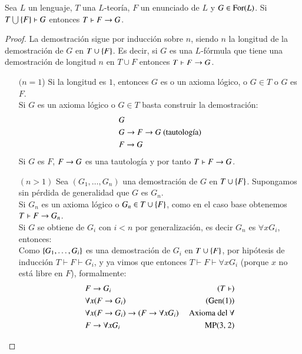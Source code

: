 \begin{thm}\label{thm:td}
    Sea $L$ un lenguaje, $T$ una $L$-teoría, $F$ un enunciado de $L$ y $G \in \mathrm{For}(L)$. Si $T \bigcup \left\{F\right\} \vdash G$ entonces $T \vdash F \rightarrow G$.
\end{thm}
\begin{proof}
    La demostración sigue por inducción sobre $n$, siendo $n$ la longitud de la demostración de $G$ en $T \cup \left\{F\right\}$. Es decir, si $G$ es una $L$-fórmula que tiene una demostración de longitud $n$ en $T \cup {F}$ entonces $T \vdash F \rightarrow G$.
    \begin{itemize}
        \item[$(n=1$)] Si la longitud es $1$, entonces $G$ es o un axioma lógico, o $G \in T$ o $G$ es $F$.\\
        Si $G$ es un axioma lógico o $G \in T$ basta construir la demostración:
        \begin{align}
            &G\\
            &G \rightarrow F \rightarrow G \text{ (tautología)}\\
            &F \rightarrow G
        \end{align}
        Si $G$ es $F$, $F \rightarrow G$ es una tautología y por tanto $T \vdash F \rightarrow G$.
        \item[$(n>1)$] Sea $(G_1, \ldots, G_n)$ una demostración de $G$ en $T \cup \left\{F\right\}$. Supongamos sin pérdida de generalidad que $G$ es $G_n$.\\
        Si $G_n$ es un axioma lógico o $G_n \in T \cup \left\{F\right\}$, como en el caso base obtenemos $T \vdash F \rightarrow G_n$.\\

        Si $G$ se obtiene de $G_i$ con $i < n$ por generalización, es decir $G_n$ es $\forall x G_i$, entonces:\\
        Como $\left\{G_1, \ldots, G_i\right\}$ es una demostración de $G_i$ en $T \cup \left\{F\right\}$, por hipótesis de inducción $T \vdash F \vdash G_i$, y ya vimos que entonces $T \vdash F \vdash \forall x G_i$ (porque $x$ no está libre en $F$), formalmente:
        \begin{align}
            &F \then G_i\ &(T\vdash)\\
            &\forall x (F \then G_i)\ &\text{(Gen($1$))}\\
            &\forall x (F \then G_i) \then (F \then \forall x G_i)\ &\text{Axioma del $\forall$}\\
            &F \then \forall x G_i\ &\text{MP($3$, $2$)}
        \end{align}


\end{itemize}
\end{proof}

